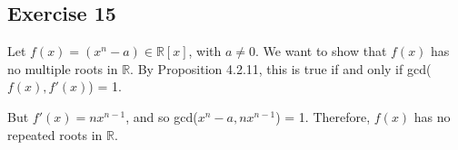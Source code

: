 \subsection*{Exercise 15}
Let $f(x) = (x^n - a) \in \mathbb{R}[x]$, with $a \ne 0$. We want to show that $f(x)$ has no multiple roots in $\mathbb{R}$. By Proposition 4.2.11, this is true if and only if gcd($f(x),f'(x)$) = 1.

But $f'(x) = nx^{n-1}$, and so gcd($x^n - a, nx^{n-1}$) = 1. Therefore, $f(x)$ has no repeated roots in $\mathbb{R}$.